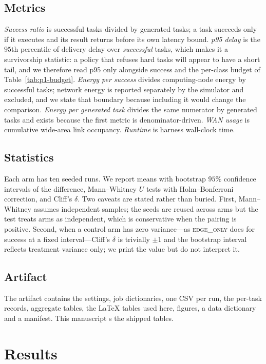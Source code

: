 \documentclass[journal,10pt]{IEEEtran}
\begin{document}
\subsection{Metrics}
\emph{Success ratio} is successful tasks divided by generated tasks; a task
succeeds only if it executes and its result returns before its own latency
bound. \emph{p95 delay} is the $95$th percentile of delivery delay over
\emph{successful} tasks, which makes it a survivorship statistic: a policy that
refuses hard tasks will appear to have a short tail, and we therefore read p95
only alongside success and the per-class budget of
Table~\ref{tab:p1-budget}. \emph{Energy per success} divides computing-node
energy by successful tasks; network energy is reported separately by the
simulator and excluded, and we state that boundary because including it would
change the comparison. \emph{Energy per generated task} divides the same
numerator by generated tasks and exists because the first metric is
denominator-driven. \emph{WAN usage} is cumulative wide-area link occupancy.
\emph{Runtime} is harness wall-clock time.

\subsection{Statistics}
Each arm has ten seeded runs. We report means with bootstrap $95\%$ confidence
intervals of the difference, Mann--Whitney $U$ tests with Holm--Bonferroni
correction, and Cliff's $\delta$. Two caveats are stated rather than buried.
First, Mann--Whitney assumes independent samples; the seeds are reused across
arms but the test treats arms as independent, which is conservative when the
pairing is positive. Second, when a control arm has zero variance---as
\textsc{edge\_only} does for success at a fixed interval---Cliff's $\delta$ is
trivially $\pm1$ and the bootstrap interval reflects treatment variance only; we
print the value but do not interpret it.

\subsection{Artifact}
The artifact contains the settings, job dictionaries, one CSV per run, the
per-task records, aggregate tables, the \LaTeX{} tables used here, figures, a
data dictionary and a manifest. This manuscript \verb||s the shipped
tables.

\section{Results}
\label{sec:results}
\label{sec:decompose}\label{sec:clock}\label{sec:deadline}\label{sec:mix}
\label{sec:algos}\label{sec:hetero}\label{sec:energy}\label{sec:trace}
\label{sec:parity}\label{sec:crosssim}\label{sec:common}\label{sec:calibration}
\end{document}
